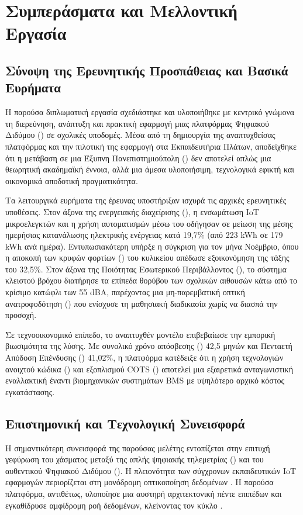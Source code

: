 \chapter{Συμπεράσματα και Μελλοντική Εργασία}
\section{Σύνοψη της Ερευνητικής Προσπάθειας και Βασικά Ευρήματα}
Η παρούσα διπλωματική εργασία σχεδιάστηκε και υλοποιήθηκε με κεντρικό γνώμονα τη διερεύνηση, ανάπτυξη και πρακτική εφαρμογή μιας πλατφόρμας Ψηφιακού Διδύμου () σε σχολικές υποδομές. Μέσα από τη δημιουργία της αναπτυχθείσας πλατφόρμας και την πιλοτική της εφαρμογή στα Εκπαιδευτήρια Πλάτων, αποδείχθηκε ότι η μετάβαση σε μια Έξυπνη Πανεπιστημιούπολη () δεν αποτελεί απλώς μια θεωρητική ακαδημαϊκή έννοια, αλλά μια άμεσα υλοποιήσιμη, τεχνολογικά εφικτή και οικονομικά αποδοτική πραγματικότητα.

Τα λειτουργικά ευρήματα της έρευνας υποστήριξαν ισχυρά τις αρχικές ερευνητικές υποθέσεις. Στον άξονα της ενεργειακής διαχείρισης (), η ενσωμάτωση IoT μικροελεγκτών και η χρήση αυτοματισμών μέσω του  οδήγησαν σε μείωση της μέσης ημερήσιας κατανάλωσης ηλεκτρικής ενέργειας κατά 19,7\% (από 223 kWh σε 179 kWh ανά ημέρα). Εντυπωσιακότερη υπήρξε η  σύγκριση για τον μήνα Νοέμβριο, όπου η αποκοπή των κρυφών φορτίων () του κυλικείου απέδωσε εξοικονόμηση της τάξης του 32,5\%. Στον άξονα της Ποιότητας Εσωτερικού Περιβάλλοντος (), το σύστημα κλειστού βρόχου διατήρησε τα επίπεδα θορύβου των σχολικών αιθουσών κάτω από το κρίσιμο κατώφλι των 55 dBA, παρέχοντας μια μη-παρεμβατική οπτική ανατροφοδότηση () που ενίσχυσε τη μαθησιακή διαδικασία χωρίς να διασπά την προσοχή.

Σε τεχνοοικονομικό επίπεδο, το αναπτυχθέν μοντέλο επιβεβαίωσε την εμπορική βιωσιμότητα της λύσης. Με συνολικό χρόνο απόσβεσης () 42,5 μηνών και Πενταετή Απόδοση Επένδυσης () 41,02\%, η πλατφόρμα κατέδειξε ότι η χρήση τεχνολογιών ανοιχτού κώδικα () και εξοπλισμού COTS () αποτελεί μια εξαιρετικά ανταγωνιστική εναλλακτική έναντι βιομηχανικών συστημάτων BMS με υψηλότερο αρχικό κόστος εγκατάστασης.

\section{Επιστημονική και Τεχνολογική Συνεισφορά}
Η σημαντικότερη συνεισφορά της παρούσας μελέτης εντοπίζεται στην επιτυχή γεφύρωση του χάσματος μεταξύ της απλής ψηφιακής τηλεμετρίας () και του αυθεντικού Ψηφιακού Διδύμου (). Η πλειονότητα των σύγχρονων εκπαιδευτικών IoT εφαρμογών περιορίζεται στη μονόδρομη οπτικοποίηση δεδομένων \cite{Kritzinger2018}. Η παρούσα πλατφόρμα, αντιθέτως, υλοποίησε μια αυστηρή αρχιτεκτονική πέντε επιπέδων και εγκαθίδρυσε αμφίδρομη ροή δεδομένων, κλείνοντας τον κύκλο \textit{}.

